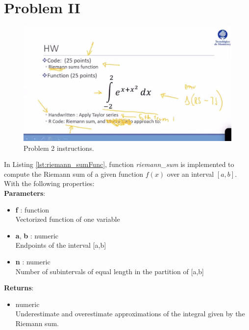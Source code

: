 \documentclass[11pt,a4paper]{article}
\begin{document}
\clearpage

\section{Problem II}\label{sec:p2}

\begin{figure}[!h]
\centering
\includegraphics[width=\textwidth]{./img/instructionsP2.jpg}
\caption{Problem 2 instructions.\label{fig:P2inst}}
\end{figure}
   
In Listing \ref{lst:riemann_sumFunc}, function \emph{riemann\_sum} is implemented to compute the Riemann sum of a given function $ f(x) $ over an interval $ [a,b] $. With the following properties:\\

\textbf{Parameters}:
\begin{itemize}
  \item {\textbf{f} : function\\
Vectorized function of one variable}
  \item {\textbf{a}, \textbf{b} : numeric\\
Endpoints of the interval [a,b]}
  \item {\textbf{n} : numeric\\
Number of subintervals of equal length in the partition of [a,b]}
\end{itemize}

\textbf{Returns}:
\begin{itemize}
  \item {numeric\\
Underestimate and overestimate approximations of the integral given by the Riemann sum.}
\end{itemize}
\end{document}
